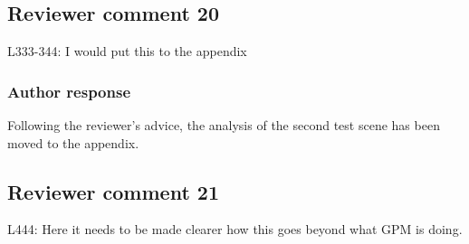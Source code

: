 %
%
%


\subsection*{Reviewer comment 20}
L333-344: I would put this to the appendix

\subsubsection*{Author response}

Following the reviewer's advice, the analysis of the second test scene
has been moved to the appendix.


\subsection*{Reviewer comment 21}
L444: Here it needs to be made clearer how this goes beyond what GPM is doing.

